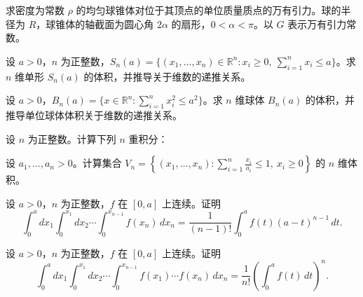 \noindent\begin{minipage}{\textwidth}
求密度为常数 $\rho$ 的均匀球锥体对位于其顶点的单位质量质点的万有引力。球的半径为 $R$，球锥体的轴截面为圆心角 $2\alpha$ 的扇形，$0<\alpha<\pi$。以 $G$ 表示万有引力常数。
\end{minipage}\par\vfill
\noindent\begin{minipage}{\textwidth}
设 $a>0$，$n$ 为正整数，$S_n(a)=\{(x_1,\ldots,x_n)\in\mathbb R^n:x_i\ge0,\ \sum_{i=1}^nx_i\le a\}$。求 $n$ 维单形 $S_n(a)$ 的体积，并推导关于维数的递推关系。
\end{minipage}\par\vfill
\newpage
\noindent\begin{minipage}{\textwidth}
设 $a>0$，$B_n(a)=\{x\in\mathbb R^n:\sum_{i=1}^nx_i^2\le a^2\}$。求 $n$ 维球体 $B_n(a)$ 的体积，并推导单位球体体积关于维数的递推关系。
\end{minipage}\par\vfill
\noindent\begin{minipage}{\textwidth}
设 $n$ 为正整数。计算下列 $n$ 重积分：
\end{minipage}\par\vfill
\noindent\begin{minipage}{\textwidth}
设 $a_1,\ldots,a_n>0$。计算集合 $\displaystyle V_n=\left\{(x_1,\ldots,x_n):\sum_{i=1}^n\frac{x_i}{a_i}\le1,\ x_i\ge0\right\}$ 的 $n$ 维体积。
\end{minipage}\par\vfill
\noindent\begin{minipage}{\textwidth}
设 $a>0$，$n$ 为正整数，$f$ 在 $[0,a]$ 上连续。证明\[\int_0^adx_1\int_0^{x_1}dx_2\cdots\int_0^{x_{n-1}}f(x_n)\,dx_n=\frac1{(n-1)!}\int_0^af(t)(a-t)^{n-1}\,dt.\]
\end{minipage}\par\vfill
\newpage
\noindent\begin{minipage}{\textwidth}
设 $a>0$，$n$ 为正整数，$f$ 在 $[0,a]$ 上连续。证明\[\int_0^adx_1\int_0^{x_1}dx_2\cdots\int_0^{x_{n-1}}f(x_1)\cdots f(x_n)\,dx_n=\frac1{n!}\left(\int_0^af(t)\,dt\right)^n.\]
\end{minipage}\par\vfill
